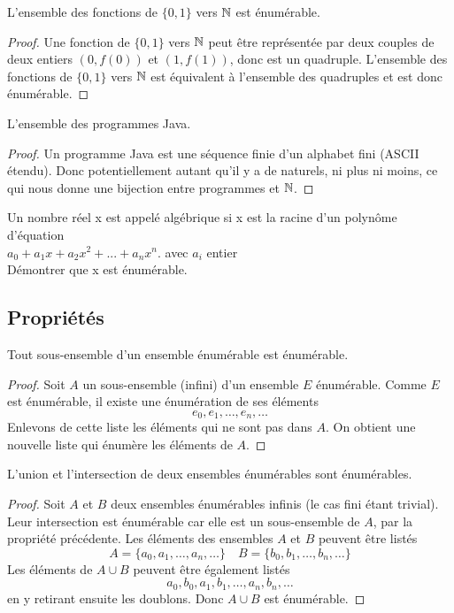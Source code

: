 \begin{myexem}
 L'ensemble des fonctions de  $\{0, 1\}$ vers $\mathbb{N}$ est énumérable.
 \begin{proof}
  Une fonction de $\{0, 1\}$ vers $\mathbb{N}$ peut être représentée par deux couples de deux entiers $(0, f(0))$ et $(1, f(1))$, donc est un quadruple. L'ensemble des fonctions de $\{0, 1\}$ vers $\mathbb{N}$ est équivalent à l'ensemble des quadruples et est donc énumérable.
 \end{proof}
\end{myexem}

 \begin{myexem}
 \label{exem:programme_java}
  L'ensemble des programmes Java.
  \begin{proof}
   Un programme Java est une séquence finie d'un alphabet fini (ASCII étendu). Donc potentiellement autant qu'il y a de naturels, ni plus ni moins, ce qui nous donne une bijection entre programmes et $\mathbb{N}$.
  \end{proof}
\end{myexem}

\begin{myexercice} \label{exerc:ensembleEnumNumAlgebrique}
Un nombre réel x est appelé algébrique si x est la racine d'un polynôme d'équation\\
\indent $a_0 + a_1x + a_2x^2 + ... + a_nx^n$.  avec $a_i$ entier\\
Démontrer que x est énumérable.
\end{myexercice}

\subsection{Propriétés}
\label{subsec:proprietes}

\begin{myprop}
	Tout sous-ensemble d'un ensemble énumérable est énumérable.
	\begin{proof}
Soit $A$ un sous-ensemble (infini) d'un ensemble $E$ énumérable.  Comme $E$ est énumérable, il existe une énumération de ses éléments
\[
e_0, e_1, \ldots , e_n, \ldots
\]
Enlevons de cette liste les éléments qui ne sont pas dans $A$.  On obtient une nouvelle liste qui énumère les éléments de $A$.
	\end{proof}
\end{myprop}

\begin{myprop}
	L'union et l'intersection de deux ensembles énumérables sont énumérables.
	\begin{proof}
		Soit $A$ et $B$ deux ensembles énumérables infinis (le cas fini étant trivial).  Leur intersection est énumérable car elle est un sous-ensemble de $A$, par la propriété précédente.   Les éléments des ensembles $A$ et $B$ peuvent être listés
\[
A = \{ a_0, a_1, \ldots , a_n, \ldots\}  \quad
B = \{ b_0, b_1, \ldots , b_n, \ldots\}
\]
Les éléments de $A \cup B$ peuvent être également listés
\[
a_0, b_0, a_1, b_1, \ldots, a_n, b_n, \ldots
\]
en y retirant ensuite les doublons. Donc $A \cup B$ est énumérable.
	\end{proof}
\end{myprop}

